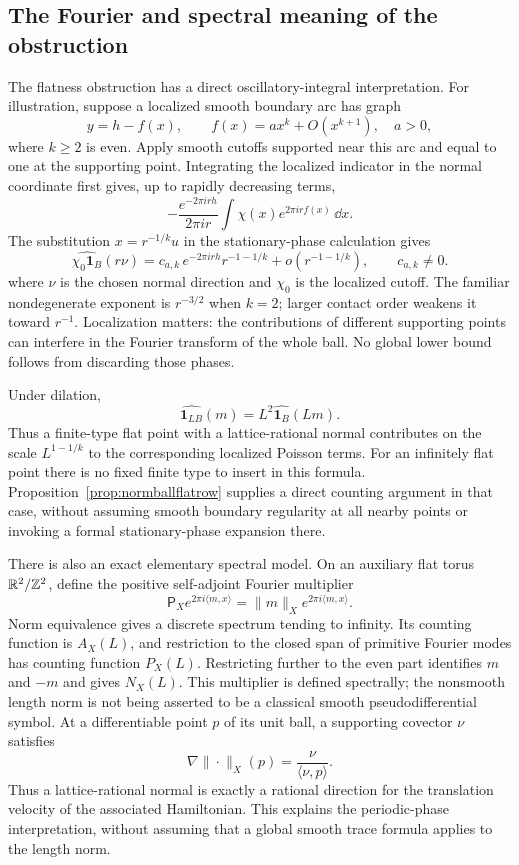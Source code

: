 \subsection{The Fourier and spectral meaning of the obstruction}
\label{subsec:normballspectral}

The flatness obstruction has a direct oscillatory-integral interpretation.
For illustration, suppose a localized smooth boundary arc has graph
\[
 y=h-f(x),\qquad f(x)=a x^k+O(x^{k+1}),\quad a>0,
\]
where $k\geq2$ is even. Apply smooth cutoffs supported near this arc
and equal to one at the supporting point. Integrating the localized
indicator in the normal coordinate first gives, up to rapidly decreasing
terms,
\[
 -\frac{e^{-2\pi i r h}}{2\pi i r}
       \int \chi(x)e^{2\pi i r f(x)}\,\dd x.
\]
The substitution $x=r^{-1/k}u$ in the stationary-phase calculation gives
\begin{equation}
 \widehat{\chi_0\mathbf1_B}(r\nu)
   =c_{a,k}\,e^{-2\pi i r h}r^{-1-1/k}
     +o(r^{-1-1/k}),\qquad c_{a,k}\ne0.
 \label{eq:normballfinitephase}
\end{equation}
where $\nu$ is the chosen normal direction and $\chi_0$ is the localized
cutoff. The familiar nondegenerate exponent is $r^{-3/2}$ when $k=2$;
larger contact order weakens it toward $r^{-1}$. Localization matters:
the contributions of different supporting points can interfere in the
Fourier transform of the whole ball. No global lower bound follows from
discarding those phases.

Under dilation,
\[
 \widehat{\mathbf1_{LB}}(m)=L^2\widehat{\mathbf1_B}(Lm).
\]
Thus a finite-type flat point with a lattice-rational normal contributes
on the scale $L^{1-1/k}$ to the corresponding localized Poisson terms.
For an infinitely flat point there is no fixed finite type to insert in
this formula. Proposition~\ref{prop:normballflatrow} supplies a direct
counting argument in that case, without assuming smooth boundary
regularity at all nearby points or invoking a formal stationary-phase
expansion there.

There is also an exact elementary spectral model. On an auxiliary flat
torus $\mathbb R^2/\mathbb Z^2$, define the positive self-adjoint Fourier multiplier
\[
 \mathsf P_X e^{2\pi i\langle m,x\rangle}
   =\|m\|_X e^{2\pi i\langle m,x\rangle}.
\]
Norm equivalence gives a discrete spectrum tending to infinity. Its
counting function is $A_X(L)$, and restriction to the closed span of
primitive Fourier modes has counting function $P_X(L)$. Restricting
further to the even part identifies $m$ and $-m$ and gives $N_X(L)$.
This multiplier is defined spectrally; the nonsmooth length norm is not
being asserted to be a classical smooth pseudodifferential symbol.
At a differentiable point $p$ of its unit ball, a supporting covector
$\nu$ satisfies
\[
 \nabla\|\cdot\|_X(p)=\frac{\nu}{\langle\nu,p\rangle}.
\]
Thus a lattice-rational normal is exactly a rational direction for the
translation velocity of the associated Hamiltonian. This explains the
periodic-phase interpretation, without assuming that a global smooth
trace formula applies to the length norm.

